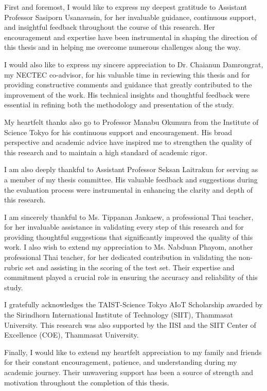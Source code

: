 %
%
First and foremost, I would like to express my deepest 
gratitude to Assistant Professor Sasiporn Usanavasin, for her 
invaluable guidance, continuous support, and insightful 
feedback throughout the course of this research. Her 
encouragement and expertise have been instrumental in shaping 
the direction of this thesis and in helping me overcome 
numerous challenges along the way.

I would also like to express my sincere appreciation to 
Dr. Chaianun Damrongrat, my NECTEC co-advisor, for his 
valuable time in reviewing this thesis and for providing 
constructive comments and guidance that greatly contributed 
to the improvement of the work. His technical insights and 
thoughtful feedback were essential in refining both the 
methodology and presentation of the study.

My heartfelt thanks also go to Professor Manabu Okumura from 
the Institute of Science Tokyo for his continuous support and 
encouragement. His broad perspective and academic advice have 
inspired me to strengthen the quality of this research and to 
maintain a high standard of academic rigor.

I am also deeply thankful to Assistant Professor Seksan 
Laitrakun for serving as a member of my thesis committee. His 
valuable feedback and suggestions during the evaluation 
process were instrumental in enhancing the clarity and depth 
of this research.

I am sincerely thankful to Ms. Tippanan Jankaew, a 
professional Thai teacher, for her invaluable assistance in 
validating every step of this research and for providing 
thoughtful suggestions that significantly improved the 
quality of this work. I also wish to extend my appreciation 
to Ms. Nabduan Phayom, another professional Thai teacher, for 
her dedicated contribution in validating the non-rubric set 
and assisting in the scoring of the test set. Their expertise 
and commitment played a crucial role in ensuring the accuracy 
and reliability of this study.

I gratefully acknowledges the TAIST-Science Tokyo AIoT 
Scholarship awarded by the Sirindhorn International Institute 
of Technology (SIIT), Thammasat University. This research was 
also supported by the IISI and the SIIT Center of Excellence 
(COE), Thammasat University.

Finally, I would like to extend my heartfelt appreciation to 
my family and friends for their constant encouragement, 
patience, and understanding during my academic journey. Their 
unwavering support has been a source of strength and 
motivation throughout the completion of this thesis.

\vspace*{10mm}
\begin{flushright}
\thesisauthor
\end{flushright}
